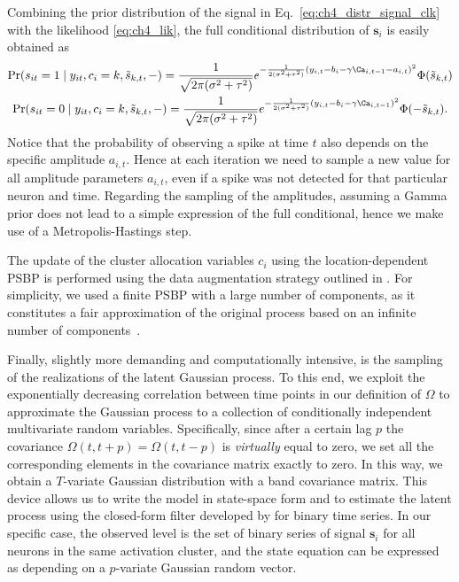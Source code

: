Combining the prior distribution of the signal in Eq.~\eqref{eq:ch4_distr_signal_clk} with the likelihood \eqref{eq:ch4_lik}, the full conditional distribution of $\bm{s}_i$ is easily obtained as
\begin{gather*}
\Pr(s_{it} = 1 \mid y_{it}, c_i=k, \tilde{s}_{k,t}, -) = \frac{1}{\sqrt{2\pi(\sigma^2+\tau^2)}}e^{-\frac{1}{2(\sigma^2+\tau^2)}(y_{i,t} - b_i - \gamma \Ca_{i,t-1}- a_{i,t})^2 } \Phi(\tilde{s}_{k,t}) \\
%
\Pr(s_{it} = 0 \mid y_{it}, c_i=k, \tilde{s}_{k,t}, -) = \frac{1}{\sqrt{2\pi(\sigma^2+\tau^2)}}e^{-\frac{1}{2(\sigma^2+\tau^2)}(y_{i,t} - b_i - \gamma \Ca_{i,t-1})^2 } \Phi(-\tilde{s}_{k,t}).
\end{gather*}
Notice that the probability of observing a spike at time $t$ also depends on the specific amplitude $a_{i,t}$. Hence at each iteration we need to sample a new value for all amplitude parameters $a_{i,t}$, even if a spike was not detected for that particular neuron and time.
Regarding the sampling of the amplitudes, assuming a Gamma prior does not lead to a simple expression of the full conditional, hence we make use of a Metropolis-Hastings step.

The update of the cluster allocation variables $c_i$ using the location-dependent PSBP is performed using the data augmentation strategy outlined in \textcite{rodriguez2011}. For simplicity, we used a finite PSBP with a large number of components, as it constitutes a fair approximation of the original process based on an infinite number of components~\parencite{rodriguez2011, ishwaran2001}.

Finally, slightly more demanding and computationally intensive, is the sampling of the realizations of the latent Gaussian process. To this end, we exploit the exponentially decreasing correlation between time points in our definition of $\Omega$ to approximate the Gaussian process to a collection of conditionally independent multivariate random variables. Specifically, since after a certain lag $p$ the covariance $\Omega(t,t+p)=\Omega(t,t-p)$ is \textit{virtually} equal to zero, we set all the corresponding elements in the covariance matrix exactly to zero. In this way, we obtain a $T$-variate Gaussian distribution with a band covariance matrix. This device allows us to write the model in state-space form and to estimate the latent process using the closed-form filter developed by \textcite{fasano2021} for binary time series. In our specific case, the observed level is the set of binary series of signal $\bm{s}_i$ for all neurons in the same activation cluster, and the state equation can be expressed as depending on a $p$-variate Gaussian random vector.


